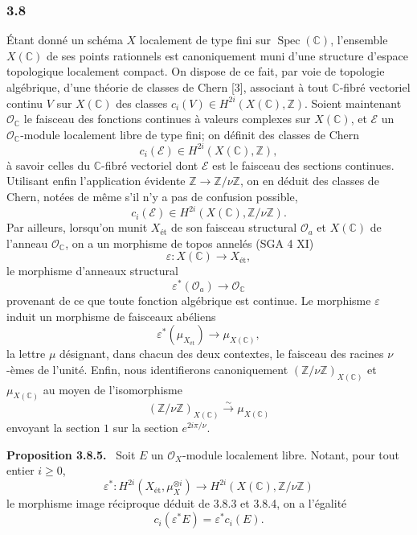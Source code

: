 \documentclass[11pt]{article}
\newenvironment{statement}[1]{\par\medskip\noindent\textbf{#1.}\ }{\par\medskip}
\begin{document}
\subsubsection*{3.8}
Étant donné un schéma $X$ localement de type fini sur $\operatorname{Spec}(\mathbb C)$, l'ensemble $X(\mathbb C)$ de ses points rationnels est canoniquement muni d'une structure d'espace topologique localement compact. On dispose de ce fait, par voie de topologie algébrique, d'une théorie de classes de Chern [3], associant à tout $\mathbb C$-fibré vectoriel continu $V$ sur $X(\mathbb C)$ des classes $c_i(V)\in H^{2i}(X(\mathbb C),\mathbb Z)$. Soient maintenant $\mathcal O_\mathbb C$ le faisceau des fonctions continues à valeurs complexes sur $X(\mathbb C)$, et $\mathcal E$ un $\mathcal O_\mathbb C$-module localement libre de type fini; on définit des classes de Chern
\[
c_i(\mathcal E)\in H^{2i}(X(\mathbb C),\mathbb Z),
\]
à savoir celles du $\mathbb C$-fibré vectoriel dont $\mathcal E$ est le faisceau des sections continues. Utilisant enfin l'application évidente $\mathbb Z\to\mathbb Z/\nu\mathbb Z$, on en déduit des classes de Chern, notées de même s'il n'y a pas de confusion possible,
\[
c_i(\mathcal E)\in H^{2i}(X(\mathbb C),\mathbb Z/\nu\mathbb Z).
\tag{3.8.1}
\]
Par ailleurs, lorsqu'on munit $X_{\mathrm{ét}}$ de son faisceau structural $\mathcal O_a$ et $X(\mathbb C)$ de l'anneau $\mathcal O_\mathbb C$, on a un morphisme de topos annelés (SGA 4 XI)
\[
\varepsilon:X(\mathbb C)\to X_{\mathrm{ét}},
\]
le morphisme d'anneaux structural
\[
\varepsilon^*(\mathcal O_a)\to\mathcal O_\mathbb C
\tag{3.8.2}
\]
provenant de ce que toute fonction algébrique est continue. Le morphisme $\varepsilon$ induit un morphisme de faisceaux abéliens
\[
\varepsilon^*(\mu_{X_{\mathrm{ét}}})\to \mu_{X(\mathbb C)},
\tag{3.8.3}
\]
la lettre $\mu$ désignant, dans chacun des deux contextes, le faisceau des racines $\nu$-èmes de l'unité. Enfin, nous identifierons canoniquement $(\mathbb Z/\nu\mathbb Z)_{X(\mathbb C)}$ et $\mu_{X(\mathbb C)}$ au moyen de l'isomorphisme
\[
(\mathbb Z/\nu\mathbb Z)_{X(\mathbb C)}
 \xrightarrow{\sim}\mu_{X(\mathbb C)}
\tag{3.8.4}
\]
envoyant la section $1$ sur la section $e^{2i\pi/\nu}$.

\begin{statement}{Proposition 3.8.5}
Soit $E$ un $\mathcal O_X$-module localement libre. Notant, pour tout entier $i\ge0$,
\[
\varepsilon^*:H^{2i}(X_{\mathrm{ét}},\mu_X^{\otimes i})
\to H^{2i}(X(\mathbb C),\mathbb Z/\nu\mathbb Z)
\]
le morphisme image réciproque déduit de 3.8.3 et 3.8.4, on a l'égalité
\[
c_i(\varepsilon^*E)=\varepsilon^*c_i(E).
\]
\end{statement}
\end{document}
